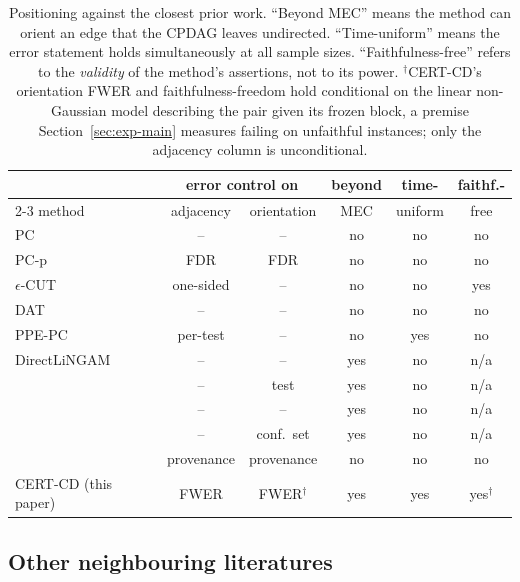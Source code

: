 \begin{table}[t]
\centering
\caption{Positioning against the closest prior work. ``Beyond MEC'' means the
method can orient an edge that the CPDAG leaves undirected. ``Time-uniform'' means the
error statement holds simultaneously at all sample sizes.
``Faithfulness-free'' refers to the \emph{validity} of the method's
assertions, not to its power. $^\dagger$CERT-CD's orientation FWER and
faithfulness-freedom hold conditional on the linear non-Gaussian model
describing the pair given its frozen block, a premise Section~\ref{sec:exp-main}
measures failing on unfaithful instances; only the adjacency
column is unconditional.}\label{tab:related}
\footnotesize
\begin{tabular}{@{}lccccc@{}}
\toprule
& \multicolumn{2}{c}{error control on} & beyond & time- & faithf.- \\
\cmidrule(lr){2-3}
method & adjacency & orientation & MEC & uniform & free \\
\midrule
PC \citep{spirtes2000causation}      & --  & --  & no  & no  & no  \\
PC-p \citep{strobl2019estimating}    & FDR & FDR & no  & no  & no  \\
$\epsilon$-CUT \citep{shaska2025causal} & one-sided & -- & no & no & yes \\
DAT \citep{amin2024scalable}         & --  & --  & no  & no  & no  \\
PPE-PC \citep{csillag2025prediction} & per-test & -- & no & yes & no \\
DirectLiNGAM \citep{shimizu2011directlingam} & -- & -- & yes & no & n/a \\
\citet{shimizu2008use}               & --  & test & yes & no  & n/a \\
\citet{ruiz2022sequentially}         & --  & --  & yes & no  & n/a \\
\citet{strieder2023confidence}       & --  & conf.\ set & yes & no & n/a \\
\citet{uehara2026iterative}          & provenance & provenance & no & no & no \\
\midrule
CERT-CD (this paper)                 & FWER & FWER$^\dagger$ & yes & yes & yes$^\dagger$ \\
\bottomrule
\end{tabular}
\end{table}

\subsection{Other neighbouring literatures}\label{sec:neighbours}

